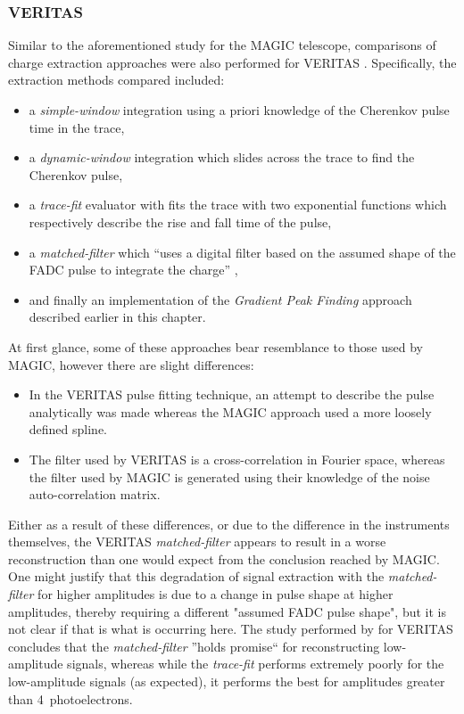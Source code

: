 \subsubsection{VERITAS}

Similar to the aforementioned study for the MAGIC telescope, comparisons of charge extraction approaches were also performed for VERITAS \cite{Holder2005, Cogan2006, Cogan2007}. Specifically, the extraction methods compared included:
\begin{itemize}
\item a \textit{simple-window} integration using a priori knowledge of the Cherenkov pulse time in the trace,
\item a \textit{dynamic-window} integration which slides across the trace to find the Cherenkov pulse,
\item a \textit{trace-fit} evaluator with fits the trace with two exponential functions which respectively describe the rise and fall time of the pulse,
\item a \textit{matched-filter} which ``uses a digital filter based on the assumed shape of the FADC pulse to integrate the charge'' \cite[][p.\@ 2]{Cogan2007},
\item and finally an implementation of the \textit{Gradient Peak Finding} approach described earlier in this chapter.
\end{itemize}
At first glance, some of these approaches bear resemblance to those used by MAGIC, however there are slight differences: 
\begin{itemize}
	\item In the VERITAS pulse fitting technique, an attempt to describe the pulse analytically was made whereas the MAGIC approach used a more loosely defined spline.
	\item The filter used by VERITAS is a cross-correlation in Fourier space, whereas the filter used by MAGIC is generated using their knowledge of the noise auto-correlation matrix.
\end{itemize}
Either as a result of these differences, or due to the difference in the instruments themselves, the VERITAS \textit{matched-filter} appears to result in a worse reconstruction than one would expect from the conclusion reached by MAGIC. One might justify that this degradation of signal extraction with the \textit{matched-filter} for higher amplitudes is due to a change in pulse shape at higher amplitudes, thereby requiring a different "assumed FADC pulse shape", but it is not clear if that is what is occurring here. The study performed by \textcite{Cogan2007} for VERITAS concludes that the \textit{matched-filter} ''holds promise`` for reconstructing low-amplitude signals, whereas while the \textit{trace-fit} performs extremely poorly for the low-amplitude signals (as expected), it performs the best for amplitudes greater than 4~photoelectrons.

